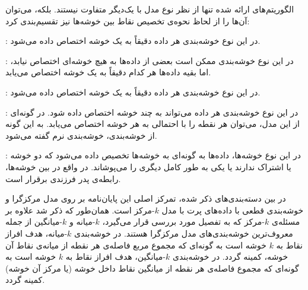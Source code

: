 
الگوریتم‌های ارائه شده تنها از نظر نوع مدل با یک‌دیگر متفاوت نیستند.
بلکه، می‌توان آن‌ها را از لحاظ نحوه‌ی تخصیص نقاط بین خوشه‌ها نیز تقسیم‌بندی کرد:


: در این نوع خوشه‌بندی هر داده دقیقاً به یک خوشه اختصاص داده می‌شود.

: در این نوع خوشه‌بندی ممکن است بعضی از داده‌ها به هیچ خوشه‌ای اختصاص نیابد، اما بقیه داده‌ها هر کدام دقیقاً به یک خوشه اختصاص می‌یابد.

: در این نوع خوشه‌بندی هر داده دقیقاً به یک خوشه اختصاص داده می‌شود.

: در این نوع خوشه‌بندی هر داده می‌تواند به چند خوشه اختصاص داده شود.
در گونه‌ای از این مدل، می‌توان هر نقطه را با احتمالی به هر خوشه اختصاص می‌یابد.
به این گونه از خوشه‌بندی، خوشه‌بندی نرم گفته می‌شود.

: در این نوع خوشه‌ها، داده‌ها به گونه‌ای به خوشه‌ها تخصیص داده می‌شود که دو خوشه یا اشتراک ندارند یا یکی به طور کامل دیگری را می‌پوشاند.
در واقع در بین خوشه‌ها، رابطه‌ی پدر فرزندی برقرار است.


در بین دسته‌بندی‌های ذکر شده، تمرکز اصلی این پایان‌نامه بر روی مدل مرکزگرا و خوشه‌بندی قطعی با داده‌های پرت با مدل $k$-مرکز است.
همان‌طور که ذکر شد علاوه بر مسئله‌ی $k$-مرکز که به تفصیل مورد بررسی قرار می‌گیرد، $k$-میانه و $k$-میانگین از جمله معروف‌ترین خوشه‌بندی‌های مدل مرکزگرا هستند.
در خوشه‌بندی $k$-میانه، هدف افراز نقاط به $k$ خوشه است به گونه‌ای که مجموع مربع فاصله‌ی هر نقطه از میانه‌ی نقاط آن خوشه، کمینه گردد.
در خوشه‌بندی $k$-میانگین، هدف افراز نقاط به $k$ خوشه است به گونه‌ای که مجموع فاصله‌ی هر نقطه از میانگین نقاط داخل خوشه (یا مرکز آن خوشه) کمینه گردد. 





